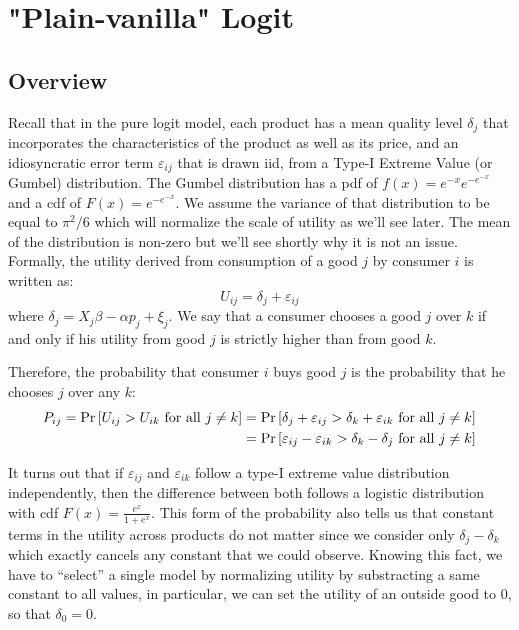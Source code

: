 \section{"Plain-vanilla" Logit}

\subsection{Overview}

Recall that in the pure logit model, each product has a mean quality level $\delta_j$ that incorporates the characteristics of the product as well as its price, and an idiosyncratic error term $\varepsilon_{ij}$ that is drawn iid, from a Type-I Extreme Value (or Gumbel) distribution. The Gumbel distribution has a pdf of $f(x) = e^{-x}e^{-e^{-x}}$ and a cdf of $F(x) = e^{-e^{-x}}$. We assume the variance of that distribution to be equal to $\pi^2/6$ which will normalize the scale of utility as we'll see later. The mean of the distribution is non-zero but we'll see shortly why it is not an issue. Formally, the utility derived from consumption of a good $j$ by consumer $i$ is written as: $$ U_{ij} = \delta_j + \varepsilon_{ij} $$ where $\delta_j = X_j\beta - \alpha p_j + \xi_j$. We say that a consumer chooses a good $j$ over $k$ if and only if his utility from good $j$ is strictly higher than from good $k$.

Therefore, the probability that consumer $i$ buys good $j$ is the probability that he chooses $j$ over any $k$: \begin{align*} P_{ij} = \operatorname{Pr}\left[U_{ij}>U_{ik}\text{ for all } j\neq k\right] & = \operatorname{Pr}\left[\delta_j + \varepsilon_{ij} >\delta_k + \varepsilon_{ik}\text{ for all } j\neq k\right] \\
& = \operatorname{Pr}\left[ \varepsilon_{ij} - \varepsilon_{ik} >\delta_k - \delta_j \text{ for all } j\neq k \right]
\end{align*} 

It turns out that if $\varepsilon_{ij}$ and $\varepsilon_{ik}$ follow a type-I extreme value distribution independently, then the difference between both follows a logistic distribution with cdf $F(x) = \frac{e^{x}}{1+e^{x}}$. This form of the probability also tells us that constant terms in the utility across products do not matter since we consider only $\delta_j - \delta_k$ which exactly cancels any constant that we could observe. Knowing this fact, we have to ``select'' a single model by normalizing utility by substracting a same constant to all values, in particular, we can set the utility of an outside good to 0, so that $\delta_0 = 0$.

